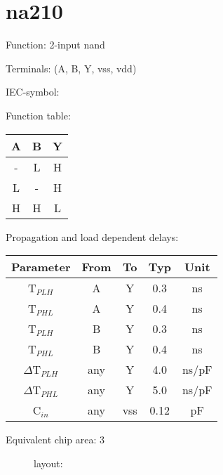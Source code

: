 \section{na210}

Function: 2-input nand

Terminals: (A, B, Y, vss, vdd)


IEC-symbol:
\begin{figure}[bth]
\end{figure}

Function table:
\begin{table}[bth]
\begin{tabular}{|c|c||c|}
\hline
A	&B	&Y\\
\hline
-	&L	&H\\
L	&-	&H\\
H	&H	&L\\
\hline
\end{tabular}
\vspace{1cm}

Propagation and load dependent delays:\\

\begin{tabular}{|c|c|c|c|c|}
\hline
Parameter               &From            &To   &Typ    &Unit\\
\hline
T$_{PLH}$               &A     		&Y      &0.3    &ns\\
T$_{PHL}$               &A    		&Y      &0.4    &ns\\
T$_{PLH}$               &B     		&Y      &0.3    &ns\\
T$_{PHL}$               &B    		&Y      &0.4    &ns\\
\hline
$\Delta$T$_{PLH}$       &any          	&Y      &4.0    &ns/pF\\
$\Delta$T$_{PHL}$       &any           	&Y      &5.0    &ns/pF\\
\hline
C$_{in}$                &any	    	&vss    &0.12   &pF\\
\hline
\end{tabular}
\end{table}


Equivalent chip area: 3






\begin{figure}[bth]
layout:\\

\end{figure}

\clearpage
